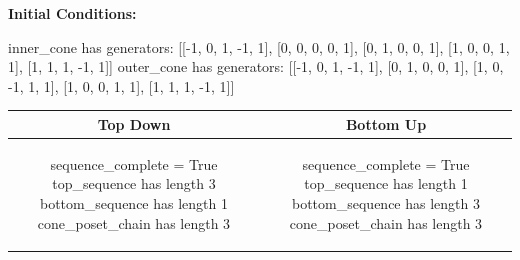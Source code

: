 \documentclass[10pt]{article}
\begin{document}
\textbf{Initial Conditions:}
\begin{SAGE}
inner_cone has generators: 
[[-1, 0, 1, -1, 1], [0, 0, 0, 0, 1], [0, 1, 0, 0, 1], [1, 0, 0, 1, 1], [1, 1, 1, -1, 1]]
outer_cone has generators: 
[[-1, 0, 1, -1, 1], [0, 1, 0, 0, 1], [1, 0, -1, 1, 1], [1, 0, 0, 1, 1], [1, 1, 1, -1, 1]]

\end{SAGE}
\begin{tabular}{c|c}
\textbf{Top Down} & \textbf{Bottom Up} \\ \hline  
\begin{SAGE}
sequence_complete = True
top_sequence has length 3
bottom_sequence has length 1
cone_poset_chain has length 3
\end{SAGE} 
&
\begin{SAGE}
sequence_complete = True
top_sequence has length 1
bottom_sequence has length 3
cone_poset_chain has length 3
\end{SAGE} 
\\ \hline


\end{tabular}
\end{document}
